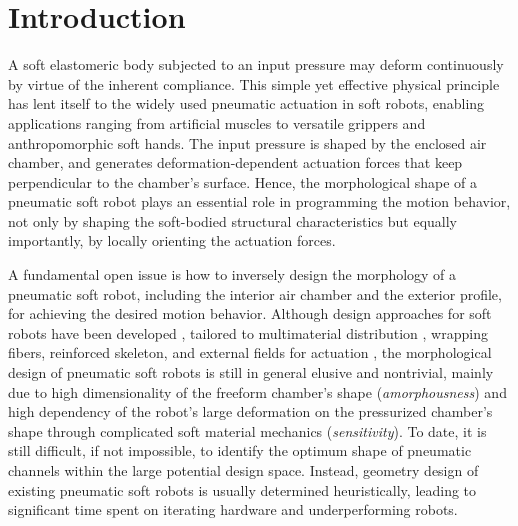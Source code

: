 \documentclass[journal]{IEEEtran}
\theoremstyle{definition}
\begin{document}
\section{Introduction}
A soft elastomeric body subjected to an input pressure may deform continuously by virtue of the inherent compliance. This simple yet effective physical principle has lent itself to the widely used pneumatic actuation in soft robots, enabling applications ranging from artificial muscles \cite{yang2015buckling, kwon2020flat} to versatile grippers \cite{cui2021enhancing, hao2020multimodal} and anthropomorphic soft hands\cite{gu2021soft, puhlmann2022rbo}. The input pressure is shaped by the enclosed air chamber, and generates deformation-dependent actuation forces that keep perpendicular to the chamber's surface. Hence, the morphological shape of a pneumatic soft robot plays an essential role in programming the motion behavior, not only by shaping the soft-bodied structural characteristics but equally importantly, by locally orienting the actuation forces.

A fundamental open issue is how to inversely design the morphology of a pneumatic soft robot, including the interior air chamber and the exterior profile, for achieving the desired motion behavior. Although design approaches for soft robots have been developed \cite{chen2020design}, tailored to multimaterial distribution \cite{hiller2012automatic,ma2017computational,ding2019design}, wrapping fibers\cite{connolly2017automatic}, reinforced skeleton\cite{chen2021topology, chen2021enhancing}, and external fields for actuation \cite{chen2019automatic, tian2020designing}, the morphological design of pneumatic soft robots is still in general elusive and nontrivial, mainly due to high dimensionality of the freeform chamber's shape (\textit{amorphousness}) and high dependency of the robot's large deformation on the pressurized chamber's shape through complicated soft material mechanics (\textit{sensitivity}). To date, it is still difficult, if not impossible, to identify the optimum shape of pneumatic channels within the large potential design space. Instead, geometry design of existing pneumatic soft robots is usually determined heuristically, leading to significant time spent on iterating hardware and underperforming robots.
\end{document}
